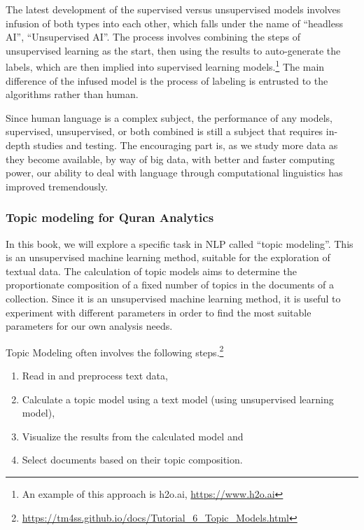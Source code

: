 \documentclass[
]{article}
\providecommand{\tightlist}{%
  \setlength{\itemsep}{0pt}\setlength{\parskip}{0pt}}
\begin{document}
The latest development of the supervised versus unsupervised models involves infusion of both types into each other, which falls under the name of ``headless AI'', ``Unsupervised AI''. The process involves combining the steps of unsupervised learning as the start, then using the results to auto-generate the labels, which are then implied into supervised learning models.\footnote{An example of this approach is h2o.ai, \url{https://www.h2o.ai}} The main difference of the infused model is the process of labeling is entrusted to the algorithms rather than human.

Since human language is a complex subject, the performance of any models, supervised, unsupervised, or both combined is still a subject that requires in-depth studies and testing. The encouraging part is, as we study more data as they become available, by way of big data, with better and faster computing power, our ability to deal with language through computational linguistics has improved tremendously.

\hypertarget{topic-modeling-for-quran-analytics}{%
\subsubsection{Topic modeling for Quran Analytics}\label{topic-modeling-for-quran-analytics}}

In this book, we will explore a specific task in NLP called ``topic modeling''. This is an unsupervised machine learning method, suitable for the exploration of textual data. The calculation of topic models aims to determine the proportionate composition of a fixed number of topics in the documents of a collection. Since it is an unsupervised machine learning method, it is useful to experiment with different parameters in order to find the most suitable parameters for our own analysis needs.

Topic Modeling often involves the following steps.\footnote{\url{https://tm4ss.github.io/docs/Tutorial_6_Topic_Models.html}}

\begin{enumerate}
\def\labelenumi{\arabic{enumi}.}
\tightlist
\item
  Read in and preprocess text data,
\item
  Calculate a topic model using a text model (using unsupervised learning model),
\item
  Visualize the results from the calculated model and
\item
  Select documents based on their topic composition.
\end{enumerate}
\end{document}
